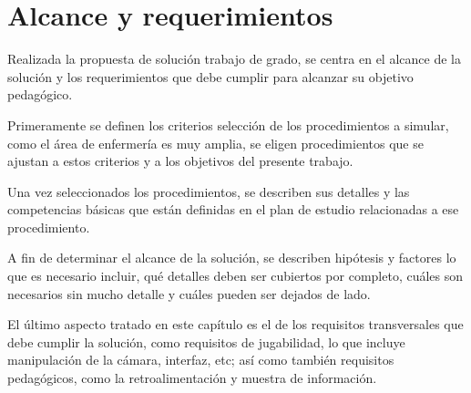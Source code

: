 \chapter{Alcance y requerimientos}
\label{chap:requerimientos}


Realizada la propuesta de solución 
trabajo de grado,  se centra en
el alcance de la solución y los requerimientos que debe cumplir para alcanzar su
objetivo pedagógico.

Primeramente se definen los criterios  selección de los
procedimientos a simular, como el área de enfermería es muy amplia, se eligen
procedimientos que se ajustan a estos criterios y a los objetivos del presente
trabajo.

Una vez seleccionados los procedimientos, se describen sus detalles y 
las competencias básicas que están definidas en el plan de 
estudio relacionadas a ese procedimiento. 

 A
fin de determinar el alcance de la solución, se describen hipótesis y factores
 lo que es necesario incluir, qué
detalles deben ser cubiertos por completo, cuáles son necesarios sin mucho
detalle y cuáles pueden ser dejados de lado. 

El último aspecto tratado en este capítulo es el de los requisitos transversales
que debe cumplir la solución, como requisitos de jugabilidad, lo que incluye manipulación de
la cámara, interfaz, etc; así como también requisitos pedagógicos, como la
retroalimentación y muestra de información.





